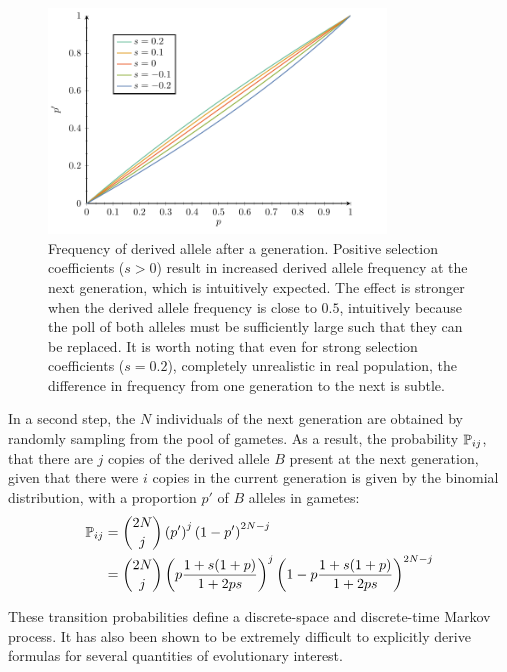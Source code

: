 \begin{figure}[H]
    \centering
    \includegraphics[width=0.8\textwidth, page=1] {figures.pdf}
    \caption[Frequency of derived {allele} after a generation]{
    Frequency of derived allele after a generation.
    Positive selection coefficients ($s > 0$) result in increased derived allele frequency at the next generation, which is intuitively expected.
    The effect is stronger when the derived allele frequency is close to $0.5$, intuitively because the poll of both alleles must be sufficiently large such that they can be replaced.
    It is worth noting that even for strong selection coefficients ($s=0.2$), completely unrealistic in real population, the difference in frequency from one generation to the next is subtle.}
\end{figure}


In a second step, the $N$ individuals of the next generation are obtained by randomly sampling from the pool of gametes.
As a result, the probability $\mathbb{P}_{ij}$, that there are $j$ copies of the derived allele $B$ present at the next generation, given that there were $i$ copies in the current generation is given by the binomial distribution, with a proportion $p'$ of $B$ alleles in gametes:
\begin{align}
\mathbb{P}_{ij} & = \binom{2 N}{j} \left( p' \right)^j \left(1 - p' \right)^{2 N -j} \\
& = \binom{2 N}{j} \left( p\dfrac{1+s(1+p)}{1 + 2ps} \right)^j \left(1 - p\dfrac{1+s(1+p)}{1 + 2ps} \right)^{2 N -j} \label{eq:binomial-WF}
\end{align}

These transition probabilities define a discrete-space and discrete-time Markov process.
It has also been shown to be extremely difficult to explicitly derive formulas for several quantities of evolutionary interest.

